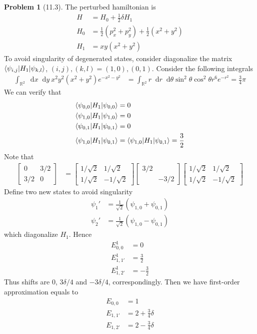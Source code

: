\documentclass[twoside,11pt]{article}
\newcommand{\RR}{\mathbb{R}}
\renewcommand*\d{\mathop{}\!\mathrm{d}}
\theoremstyle{definition}
\newtheorem{problem}{Problem}
\theoremstyle{remark}
\begin{document}
\begin{problem}[11.3]
The perturbed hamiltonian is
\begin{align*}
    H &= H_0 + \frac{1}{2}\delta H_1\\
    H_0 &= \frac{1}{2}(p_x^2+p_y^2) + \frac{1}{2}(x^2+y^2)\\
    H_1 &= xy(x^2+y^2)
\end{align*}
To avoid singularity of degenerated states, consider diagonalize the matrix
$\braket{\psi_{i,j}|H_1|\psi_{k,l}}$, $(i, j), (k, l) = (1, 0), (0, 1)$.
Consider the following integrals
\begin{align*}
    \int_{\RR^2}\d x\d y\ x^2y^2 (x^2+y^2)e^{-x^2-y^2} &= 
    \int_{\RR^2} r\d r\d \theta \sin^2\theta\cos^2\theta r^6 e^{-r^2}
    = \frac{3}{4}\pi
\end{align*}
We can verify that
\begin{align*}
    \braket{\psi_{0,0}|H_1|\psi_{0,0}} &= 0\\
    \braket{\psi_{1,0}|H_1|\psi_{1,0}} &= 0\\
    \braket{\psi_{0,1}|H_1|\psi_{0,1}} &= 0\\
    \braket{\psi_{1,0}|H_1|\psi_{0,1}} &= 
    \braket{\psi_{1,0}|H_1|\psi_{0,1}} = \frac{3}{2}
\end{align*}
Note that
\begin{align*}
    \begin{bmatrix}
        0 & 3/2 \\ 3/2 & 0
    \end{bmatrix} &= 
    \begin{bmatrix}
        1/\sqrt{2} & 1/\sqrt{2}\\
        1/\sqrt{2} & -1/\sqrt{2}
    \end{bmatrix}
    \begin{bmatrix}
        3/2 & \\
        & -3/2
    \end{bmatrix}
    \begin{bmatrix}
        1/\sqrt{2} & 1/\sqrt{2}\\
        1/\sqrt{2} & -1/\sqrt{2}
    \end{bmatrix}
\end{align*}
Define two new states to avoid singularity
\begin{align*}
    \psi_1' &= \frac{1}{\sqrt{2}}(\psi_{1,0} + \psi_{0,1})\\
    \psi_2' &= \frac{1}{\sqrt{2}}(\psi_{1,0} - \psi_{0,1})
\end{align*}
which diagonalize $H_1$.
Hence
\begin{align*}
    E_{0,0}^1 &= 0\\
    E_{1,1'}^1 &= \frac{3}{2}\\
    E_{1,2'}^1 &= -\frac{3}{2}
\end{align*}
Thus shifts are $0$, $3\delta/4$ and $-3\delta/4$, correspondingly.
Then we have first-order approximation equals to
\begin{align*}
    E_{0,0} &= 1\\
    E_{1,1'} &= 2+\frac{3}{4}\delta\\
    E_{1,2'} &= 2-\frac{3}{4}\delta
\end{align*}




\end{problem}
\end{document}
